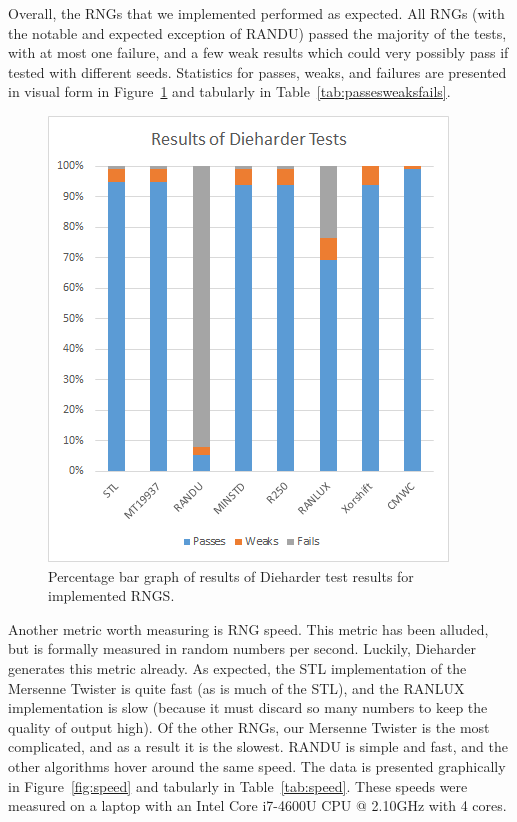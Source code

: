 Overall, the RNGs that we implemented performed as expected. All RNGs (with the notable and expected exception of RANDU) passed the majority of the tests, with at most one failure, and a few weak results which could very possibly pass if tested with different seeds. Statistics for passes, weaks, and failures are presented in visual form in Figure~\ref{fig:passesweaksfails} and tabularly in Table~\ref{tab:passesweaksfails}.

\begin{figure}[tb]
    \begin{center}
        \includegraphics[width=\linewidth]{figures/passesweaksfails.png}
    \end{center}
    \caption{Percentage bar graph of results of Dieharder test results for implemented RNGS.}
    \label{fig:passesweaksfails}
\end{figure}



Another metric worth measuring is RNG speed. This metric has been alluded, but is formally measured in random numbers per second. Luckily, Dieharder generates this metric already. As expected, the STL implementation of the Mersenne Twister is quite fast (as is much of the STL), and the RANLUX implementation is slow (because it must discard so many numbers to keep the quality of output high). Of the other RNGs, our Mersenne Twister is the most complicated, and as a result it is the slowest. RANDU is simple and fast, and the other algorithms hover around the same speed. The data is presented graphically in Figure~\ref{fig:speed} and tabularly in Table~\ref{tab:speed}. These speeds were measured on a laptop with an Intel Core i7-4600U CPU @ 2.10GHz with 4 cores.

